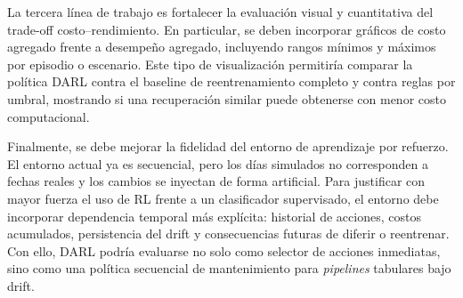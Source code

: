 La tercera línea de trabajo es fortalecer la evaluación visual y cuantitativa
del trade-off costo--rendimiento. En particular, se deben incorporar gráficos de
costo agregado frente a desempeño agregado, incluyendo rangos mínimos y máximos
por episodio o escenario. Este tipo de visualización permitiría comparar la
política DARL contra el baseline de reentrenamiento completo y contra reglas por
umbral, mostrando si una recuperación similar puede obtenerse con menor costo
computacional.

Finalmente, se debe mejorar la fidelidad del entorno de aprendizaje por
refuerzo. El entorno actual ya es secuencial, pero los días simulados no corresponden a
fechas reales y los cambios se inyectan de forma artificial. Para
justificar con mayor fuerza el uso de RL frente a un clasificador supervisado,
el entorno debe incorporar dependencia temporal más explícita: historial de
acciones, costos acumulados, persistencia del drift y consecuencias futuras de
diferir o reentrenar. Con ello, DARL podría evaluarse no solo como selector de
acciones inmediatas, sino como una política secuencial de mantenimiento para
\textit{pipelines} tabulares bajo drift.
